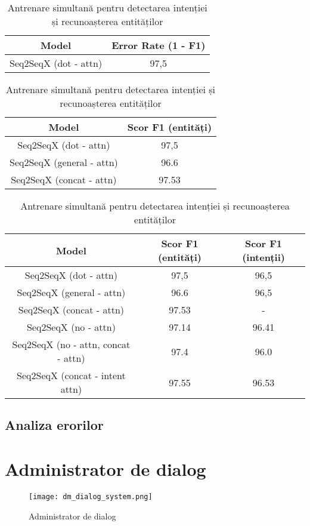 \begin{table}[htp]
	\caption{Antrenare independentă pentru detectarea intenției}
	\label{rezultate1}
	\centering
	\begin{tabular}{ c c }
		
		\hline
		\textbf{Model} 		 & \textbf{Error Rate (1 - F1)}\\
		\hline
		Seq2SeqX (dot - attn) & 97,5 \\
		\hline
	\end{tabular}
	\bigskip
	
	\caption{Antrenare independentă pentru recunoașterea entităților}
	\label{rezultate2}
	\centering
	\begin{tabular}{ c c } 
		\hline
		\textbf{Model}	& \textbf{Scor F1 (entități)} \\
		\hline
		Seq2SeqX (dot - attn) & 97,5 \\
		\hline
		Seq2SeqX (general - attn) & 96.6 \\
		\hline
		Seq2SeqX (concat - attn) & 97.53 \\
		\hline
	\end{tabular}
	\bigskip
	
	\caption{Antrenare simultană pentru detectarea intenției și recunoașterea entităților}
	\label{rezultate3}
	\centering
	\begin{tabular}{ c c c } 
		\hline
		\textbf{Model} 		 & \textbf{Scor F1 (entități)} & \textbf{Scor F1 (intenții)}\\
		\hline
		Seq2SeqX (dot - attn) & 97,5 & 96,5 \\
		\hline
		Seq2SeqX (general - attn) & 96.6 & 96,5 \\
		\hline
		Seq2SeqX (concat - attn) & 97.53 & - \\
		\hline
		Seq2SeqX (no - attn) & 97.14 & 96.41 \\ %
		\hline
		Seq2SeqX (no - attn, concat - attn) & 97.4 & 96.0 \\
		\hline
		Seq2SeqX (concat - intent attn) & 97.55 & 96.53 \\
		\hline
	\end{tabular}
\end{table}

\subsection{Analiza erorilor}


\section{Administrator de dialog}
\begin{figure}[h]
	\centering
	\texttt{[image: dm\_dialog\_system.png]}
	\caption{Administrator de dialog}
	\label{fig:dm_ds_proc}
\end{figure}

